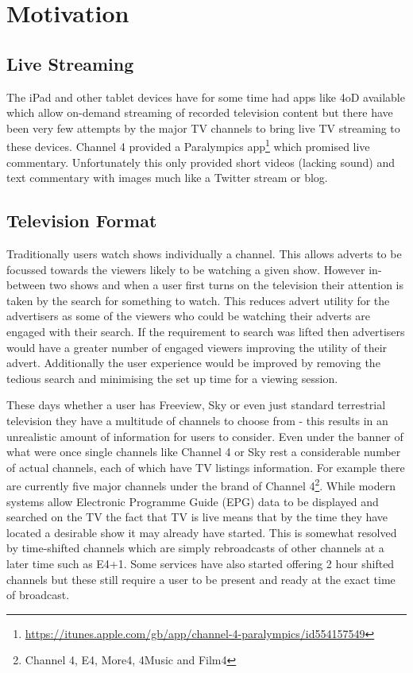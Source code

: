 \section{Motivation}

\subsection{Live Streaming}
The iPad and other tablet devices have for some time had apps like 4oD available which allow on-demand streaming of recorded television content but there have been very few attempts by the major TV channels to bring live TV streaming to these devices. Channel 4 provided a Paralympics app\footnote{\url{https://itunes.apple.com/gb/app/channel-4-paralympics/id554157549}} which promised live commentary. Unfortunately this only provided short videos (lacking sound) and text commentary with images much like a Twitter stream or blog.

\subsection{Television Format}
Traditionally users watch shows individually a channel. This allows adverts to be focussed towards the viewers likely to be watching a given show. However in-between two shows and when a user first turns on the television their attention is taken by the search for something to watch. This reduces advert utility for the advertisers as some of the viewers who could be watching their adverts are engaged with their search. If the requirement to search was lifted then advertisers would have a greater number of engaged viewers improving the utility of their advert. Additionally the user experience would be improved by removing the tedious search and minimising the set up time for a viewing session.

These days whether a user has Freeview, Sky or even just standard terrestrial television they have a multitude of channels to choose from - this results in an unrealistic amount of information for users to consider\citep{informationOverload}. Even under the banner of what were once single channels like Channel 4 or Sky rest a considerable number of actual channels, each of which have TV listings information. For example there are currently five major channels under the brand of Channel 4\footnote{Channel 4, E4, More4, 4Music and Film4}. While modern systems allow Electronic Programme Guide (EPG) data to be displayed and searched on the TV the fact that TV is live means that by the time they have located a desirable show it may already have started. This is somewhat resolved by time-shifted channels which are simply rebroadcasts of other channels at a later time such as E4+1. Some services have also started offering 2 hour shifted channels but these still require a user to be present and ready at the exact time of broadcast.

